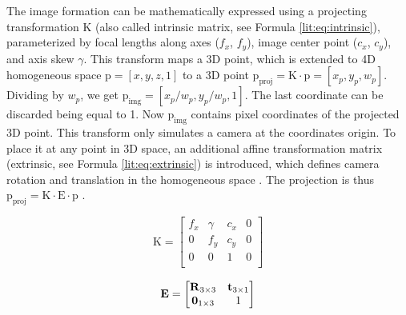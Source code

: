 The image formation can be mathematically expressed using a projecting transformation $\bm{\mathrm{K}}$ (also called intrinsic matrix, see Formula \ref{lit:eq:intrinsic}), parameterized by focal lengths along axes ($f_x$, $f_y$), image center point ($c_x$, $c_y$), and axis skew $\gamma$. This transform maps a 3D point, which is extended to 4D homogeneous space $\bm{\mathrm{p}} = [x, y, z, 1]$ to a 3D point $\bm{\mathrm{p_{proj}}} = \bm{\mathrm{K}} \cdot \bm{\mathrm{p}} = [x_p, y_p, w_p]$. Dividing by $w_p$, we get $\bm{\mathrm{p_{img}}} = [x_p/w_p, y_p/w_p, 1]$. The last coordinate can be discarded being equal to 1. Now $\bm{\mathrm{p_{img}}}$ contains pixel coordinates of the projected 3D point. This transform only simulates a camera at the coordinates origin. To place it at any point in 3D space, an additional affine transformation matrix  (extrinsic, see Formula \ref{lit:eq:extrinsic}) is introduced, which defines camera rotation  and translation  in the homogeneous space \cite{survey:advances-nn22}. The projection is thus $\bm{\mathrm{p_{proj}}} = \bm{\mathrm{K}} \cdot \bm{\mathrm{E}} \cdot \bm{\mathrm{p}}$ .

\begin{multicols}{2}
	\setlength\abovedisplayskip{0pt}
	\noindent
	\begin{equation}
		\bm{\mathrm{K}} = \begin{bmatrix} 
			f_x & \gamma & c_x & 0 \\
			0   & f_y    & c_y & 0 \\
			0   & 0      & 1   & 0 \\
		\end{bmatrix}
		\label{lit:eq:intrinsic}
	\end{equation}
	\begin{equation}
		\vphantom{\begin{bmatrix} a \\ b \\ c \end{bmatrix}}
		\bm{\mathrm{E}} = \begin{bmatrix} 
			\bm{\mathrm{R}}_{3 \times 3} & \bm{\mathrm{t}}_{3 \times 1} \\
			\bm{\mathrm{0}}_{1 \times 3} & 1 \\
		\end{bmatrix}
		\label{lit:eq:extrinsic}
	\end{equation}
	\setlength\belowdisplayskip{0pt} 
\end{multicols} 


